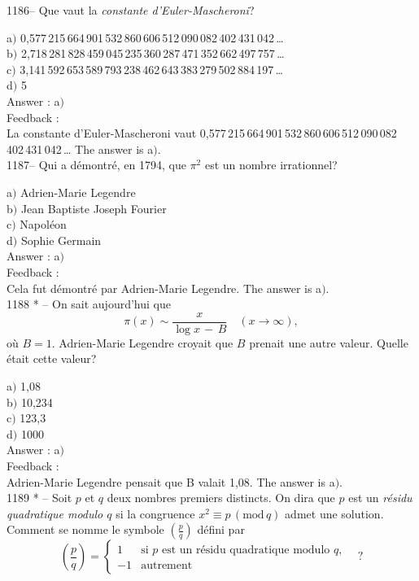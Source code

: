 \documentclass[letterpaper, 12pt]{article}
\begin{document}
1186-- Que vaut la {\sl constante d'Euler-Mascheroni}?

a$)$
0,577\,215\,664\,901\,532\,860\,606\,512\,090\,082\,402\,431\,042\,\ldots \\
b$)$
2,718\,281\,828\,459\,045\,235\,360\,287\,471\,352\,662\,497\,757\,\ldots \\
c$)$
3,141\,592\,653\,589\,793\,238\,462\,643\,383\,279\,502\,884\,197\,\ldots \\
d$)$ 5\\

Answer : a$)$\\

Feedback : \\
La constante d'Euler-Mascheroni vaut
0,577\,215\,664\,901\,532\,860\,606\,512\,090\,082\,402\,431\,042\,\ldots
The answer is a$)$.\\

1187-- Qui a d\'emontr\'e, en 1794, que $\pi^2$ est un nombre
irrationnel?

a$)$ Adrien-Marie Legendre \\
b$)$ Jean Baptiste Joseph Fourier \\
c$)$ Napol\'eon \\
d$)$ Sophie Germain\\

Answer : a$)$\\

Feedback : \\
Cela fut d\'emontr\'e par Adrien-Marie Legendre.
The answer is a$)$.\\

1188 * -- On sait aujourd'hui que
$$\pi(x)\sim\displaystyle\frac x{\log x\,-\,B}\quad(x\to\infty),$$
o\`u $B=1$. Adrien-Marie Legendre croyait que $B$ prenait une autre
valeur. Quelle \'etait cette valeur?

a$)$ 1,08 \\
b$)$ 10,234 \\
c$)$ 123,3 \\
d$)$ 1000\\

Answer : a$)$\\

Feedback : \\
Adrien-Marie Legendre pensait que B valait 1,08.
The answer is a$)$.\\

1189 * -- Soit $p$ et $q$ deux nombres premiers distincts.
On dira que  $p$ est un {\sl r\'esidu quadratique modulo $q$} si la
congruence $x^2\equiv p\,(\mathrm{mod}\,q)$
admet une solution.
Comment se nomme le symbole $(\frac pq)$ d\'efini par
$$\displaystyle{\left(\frac pq\right)=\begin{cases}
1&\text{si $p$ est un r\'esidu quadratique modulo $q$,}\\[3mm]
-1&\text{autrement}
\end{cases}}\quad?$$
\end{document}
